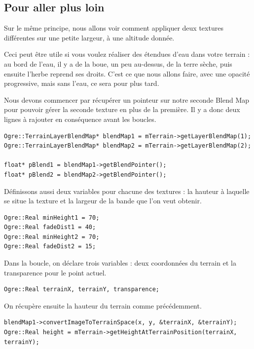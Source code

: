 \documentclass[10pt,a4paper]{report}
\begin{document}
\subsection{Pour aller plus loin}

Sur le m\^eme principe, nous allons voir comment appliquer deux textures diff\'erentes sur une petite largeur, \`a une altitude donn\'ee.

Ceci peut \^etre utile si vous voulez r\'ealiser des \'etendues d'eau dans votre terrain : au bord de l'eau, il y a de la boue, un peu au-dessus, de la terre s\`eche, puis ensuite l'herbe reprend ses droits. C'est ce que nous allons faire, avec une opacit\'e progressive, mais sans l'eau, ce sera pour plus tard.

Nous devons commencer par r\'ecup\'erer un pointeur sur notre seconde Blend Map pour pouvoir g\'erer la seconde texture en plus de la premi\`ere. Il y a donc deux lignes \`a rajouter en cons\'equence avant les boucles.




\begin{lstlisting}[caption={R\'ecup\'eration des Blend Map pour le premier et le second terrain}]
Ogre::TerrainLayerBlendMap* blendMap1 = mTerrain->getLayerBlendMap(1);
Ogre::TerrainLayerBlendMap* blendMap2 = mTerrain->getLayerBlendMap(2);

float* pBlend1 = blendMap1->getBlendPointer();
float* pBlend2 = blendMap2->getBlendPointer();
\end{lstlisting}

D\'efinissons aussi deux variables pour chacune des textures : la hauteur \`a laquelle se situe la texture et la largeur de la bande que l'on veut obtenir.

\begin{lstlisting}[caption={}]
Ogre::Real minHeight1 = 70;
Ogre::Real fadeDist1 = 40;
Ogre::Real minHeight2 = 70;
Ogre::Real fadeDist2 = 15;
\end{lstlisting}

Dans la boucle, on d\'eclare trois variables : deux coordonn\'ees du terrain et la transparence pour le point actuel.

\begin{lstlisting}[caption={}]
Ogre::Real terrainX, terrainY, transparence;
\end{lstlisting}

On r\'ecup\`ere ensuite la hauteur du terrain comme pr\'ec\'edemment.

\begin{lstlisting}[caption={}]
blendMap1->convertImageToTerrainSpace(x, y, &terrainX, &terrainY);
Ogre::Real height = mTerrain->getHeightAtTerrainPosition(terrainX, terrainY);
\end{lstlisting}
\end{document}
